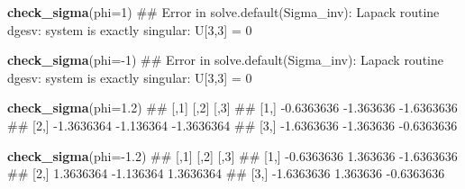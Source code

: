 \documentclass[11pt,ignorenonframetext,]{beamer}
\newenvironment{Shaded}{}{}
\newcommand{\DataTypeTok}[1]{\textcolor[rgb]{0.56,0.13,0.00}{#1}}
\newcommand{\DecValTok}[1]{\textcolor[rgb]{0.25,0.63,0.44}{#1}}
\newcommand{\FloatTok}[1]{\textcolor[rgb]{0.25,0.63,0.44}{#1}}
\newcommand{\KeywordTok}[1]{\textcolor[rgb]{0.00,0.44,0.13}{\textbf{#1}}}
\newcommand{\NormalTok}[1]{#1}
\newcommand{\OperatorTok}[1]{\textcolor[rgb]{0.40,0.40,0.40}{#1}}
\let\oldShaded\Shaded
\let\endoldShaded\endShaded
\renewenvironment{Shaded}{\footnotesize\begin{spacing}{0.9}\oldShaded}{\endoldShaded\end{spacing}}
\begin{document}
\begin{frame}[fragile]{}
\protect\hypertarget{section}{}

\begin{Shaded}
\begin{Highlighting}[]
\KeywordTok{check_sigma}\NormalTok{(}\DataTypeTok{phi=}\DecValTok{1}\NormalTok{)}
\NormalTok{## Error in solve.default(Sigma_inv): Lapack routine dgesv: system is exactly singular: U[3,3] = 0}

\KeywordTok{check_sigma}\NormalTok{(}\DataTypeTok{phi=}\OperatorTok{-}\DecValTok{1}\NormalTok{)}
\NormalTok{## Error in solve.default(Sigma_inv): Lapack routine dgesv: system is exactly singular: U[3,3] = 0}

\KeywordTok{check_sigma}\NormalTok{(}\DataTypeTok{phi=}\FloatTok{1.2}\NormalTok{)}
\NormalTok{##            [,1]      [,2]       [,3]}
\NormalTok{## [1,] -0.6363636 -1.363636 -1.6363636}
\NormalTok{## [2,] -1.3636364 -1.136364 -1.3636364}
\NormalTok{## [3,] -1.6363636 -1.363636 -0.6363636}

\KeywordTok{check_sigma}\NormalTok{(}\DataTypeTok{phi=}\OperatorTok{-}\FloatTok{1.2}\NormalTok{)}
\NormalTok{##            [,1]      [,2]       [,3]}
\NormalTok{## [1,] -0.6363636  1.363636 -1.6363636}
\NormalTok{## [2,]  1.3636364 -1.136364  1.3636364}
\NormalTok{## [3,] -1.6363636  1.363636 -0.6363636}
\end{Highlighting}
\end{Shaded}

\end{frame}
\end{document}
